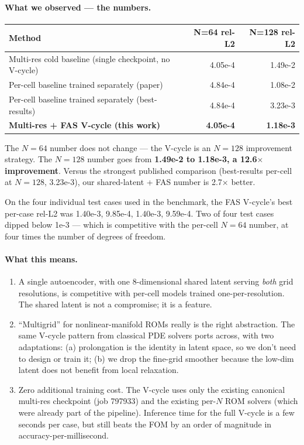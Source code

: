 \paragraph{What we observed --- the numbers.}

\begin{center}
\begin{tabular}{l r r}
  \textbf{Method} & \textbf{N=64 rel-L2} & \textbf{N=128 rel-L2} \\
  \hline
  Multi-res cold baseline (single checkpoint, no V-cycle) & 4.05e-4 & 1.49e-2 \\
  Per-cell baseline trained separately (paper) & 4.84e-4 & 1.08e-2 \\
  Per-cell baseline trained separately (best-results) & 4.84e-4 & 3.23e-3 \\
  \textbf{Multi-res + FAS V-cycle (this work)} & \textbf{4.05e-4} & \textbf{1.18e-3} \\
\end{tabular}
\end{center}

The $N=64$ number does not change --- the V-cycle is an $N=128$
improvement strategy. The $N=128$ number goes from
\textbf{1.49e-2 to 1.18e-3, a 12.6$\times$ improvement}. Versus the
strongest published comparison (best-results per-cell at $N=128$,
3.23e-3), our shared-latent + FAS number is 2.7$\times$ better.

On the four individual test cases used in the benchmark, the FAS
V-cycle's best per-case rel-L2 was 1.40e-3, 9.85e-4, 1.40e-3, 9.59e-4.
Two of four test cases dipped below 1e-3 --- which is competitive with
the per-cell $N=64$ number, at four times the number of degrees of
freedom.

\paragraph{What this means.}
\begin{enumerate}
  \item A single autoencoder, with one 8-dimensional shared latent
        serving \emph{both} grid resolutions, is competitive with
        per-cell models trained one-per-resolution. The shared latent is
        not a compromise; it is a feature.
  \item ``Multigrid'' for nonlinear-manifold ROMs really is the right
        abstraction. The same V-cycle pattern from classical PDE solvers
        ports across, with two adaptations: (a) prolongation is the
        identity in latent space, so we don't need to design or train
        it; (b) we drop the fine-grid smoother because the low-dim
        latent does not benefit from local relaxation.
  \item Zero additional training cost. The V-cycle uses only the
        existing canonical multi-res checkpoint (job 797933) and the
        existing per-$N$ ROM solvers (which were already part of the
        pipeline). Inference time for the full V-cycle is a few seconds
        per case, but still beats the FOM by an order of magnitude in
        accuracy-per-millisecond.
\end{enumerate}

